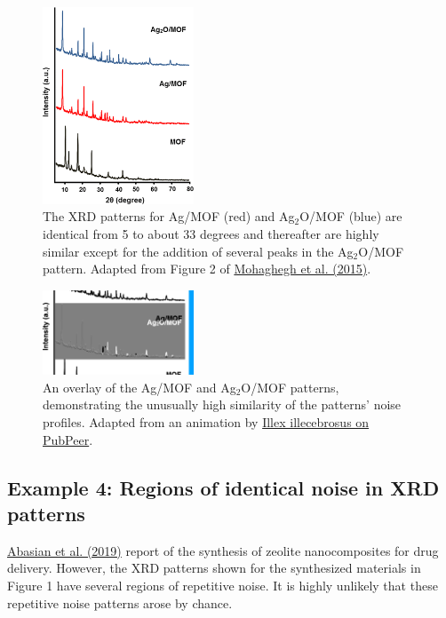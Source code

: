 \documentclass[letterpaper, 12pt]{article}
\begin{document}
\begin{figure}[h!tbp]
    \centering
    \includegraphics[width=0.4\textwidth]{img/xrd_data_duplication/mohaghegh_figure_2.png}
    \caption*{The XRD patterns for Ag/MOF (red) and Ag$_\text{2}$O/MOF (blue) are identical from 5 to about 33 degrees and thereafter are highly similar except for the addition of several peaks in the Ag$_\text{2}$O/MOF pattern. Adapted from Figure 2 of \href{https://doi.org/10.1007/s10853-015-9003-3}{Mohaghegh et al. (2015)}.}
\end{figure}

\begin{figure}[h!tbp]
    \centering
    \includegraphics[width=0.4\textwidth]{img/xrd_data_duplication/mohaghegh_figure_2_animation.png}
    \caption*{An overlay of the Ag/MOF and Ag$_\text{2}$O/MOF patterns, demonstrating the unusually high similarity of the patterns' noise profiles. Adapted from an animation by \href{https://pubpeer.com/publications/7BE7C2A93C385F700F1C6B5BC90294\#8}{Illex illecebrosus on PubPeer}.}
\end{figure}

\pagebreak

\subsection*{Example 4: Regions of identical noise in XRD patterns}

\href{https://doi.org/10.1016/j.ijbiomac.2018.09.215}{Abasian et al. (2019)} report of the synthesis of zeolite nanocomposites for drug delivery. However, the XRD patterns shown for the synthesized materials in Figure 1 have several regions of repetitive noise. It is highly unlikely that these repetitive noise patterns arose by chance.
\end{document}

